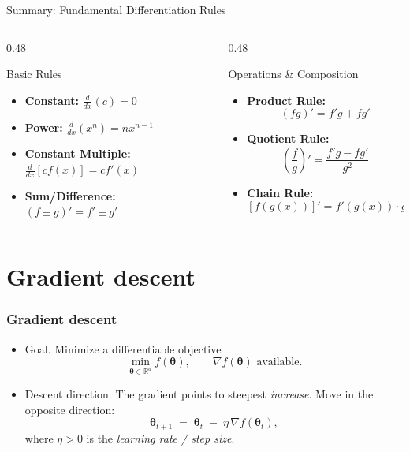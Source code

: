 \documentclass[aspectratio=169]{beamer}
\begin{document}
\begin{frame}{Summary: Fundamental Differentiation Rules}
	\small
	\begin{columns}[t]
		\begin{column}{0.48\textwidth}
			\begin{block}{Basic Rules}
				\begin{itemize}
					\item \textbf{Constant:} $\frac{d}{dx}(c) = 0$
					\item \textbf{Power:} $\frac{d}{dx}(x^n) = nx^{n-1}$
					\item \textbf{Constant Multiple:} $\frac{d}{dx}[cf(x)] = c f'(x)$
					\item \textbf{Sum/Difference:} $(f \pm g)' = f' \pm g'$
				\end{itemize}
			\end{block}
		\end{column}
		
		\begin{column}{0.48\textwidth}
			\begin{block}{Operations \& Composition}
				\begin{itemize}
					\item \textbf{Product Rule:} 
					\[ (fg)' = f'g + fg' \]
					\item \textbf{Quotient Rule:} 
					\[ \left(\frac{f}{g}\right)' = \frac{f'g - fg'}{g^2} \]
					\item \textbf{Chain Rule:} 
					\[ [f(g(x))]' = f'(g(x)) \cdot g'(x) \]
				\end{itemize}
			\end{block}
		\end{column}
	\end{columns}
	
\end{frame}


\section{Gradient descent}

\begin{frame}
\frametitle{Gradient descent}
\begin{itemize}
	\item Goal. Minimize a differentiable objective
	\[
	\min_{\bm{\theta}\in\mathbb{R}^d} f(\bm{\theta}), \qquad \nabla f(\bm{\theta}) \text{ available.}
	\]
	\item Descent direction. The gradient points to steepest \emph{increase}. Move in the opposite direction:
	\[
	\bm{\theta}_{t+1} \;=\; \bm{\theta}_t \;-\; \eta \,\nabla f(\bm{\theta}_t),
	\]
	where $\eta>0$ is the \emph{learning rate / step size}.
\end{itemize}
\end{frame}
\end{document}

